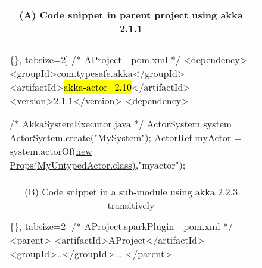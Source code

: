 \begin{figure}[!htb]
 \begin{minipage}{0.5\textwidth}
\scriptsize 
\begin{tabular}{@{}p{}} 
 \hline 
  \multicolumn{1}{c}{(A) Code snippet in parent project using akka 2.1.1 } \\ \hline
  \vspace{-4mm}
\begin{Verbatim}[commandchars=\\\{\}, tabsize=2]
/* AProject - pom.xml */
<dependency>
  <groupId>com.typesafe.akka</groupId>
  <artifactId>\hl{akka-actor_2.10}</artifactId>
  <version>2.1.1</version>
<dependency>

/* AkkaSystemExecutor.java */
ActorSystem system = ActorSystem.create("MySystem");
ActorRef myActor = system.actorOf(\underline{new Props(MyUntypedActor.class)},"myactor");
\end{Verbatim}
\vspace{-4mm}
 \\ \hline
  \multicolumn{1}{c}{(B) Code snippet in a sub-module using akka 2.2.3 transitively } \\ \hline
    \vspace{-4mm}
\begin{Verbatim}[commandchars=\\\{\}, tabsize=2]
/* AProject.sparkPlugin - pom.xml */
<parent>
  <artifactId>AProject</artifactId>
  <groupId>..</groupId>...
</parent>
	

\end{Verbatim}
\end{tabular}
\end{minipage}
\end{figure}
